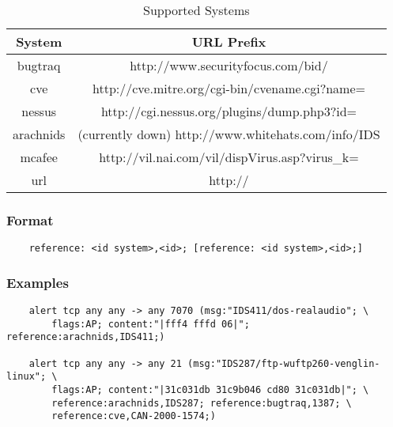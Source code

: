 \documentclass[english]{report}
\begin{document}
\begin{table}[h]
\begin{center}
\caption{Supported Systems}
\label{references systems}
\begin{tabular}{|c|c|}

\hline 
System&
URL Prefix\\
\hline

\hline 
bugtraq&
http://www.securityfocus.com/bid/\\

\hline 
cve&
http://cve.mitre.org/cgi-bin/cvename.cgi?name=\\

\hline 
nessus &
http://cgi.nessus.org/plugins/dump.php3?id=\\

\hline 
arachnids&
(currently down) http://www.whitehats.com/info/IDS\\

\hline 
mcafee&
http://vil.nai.com/vil/dispVirus.asp?virus\_k=\\

\hline 
url&
http://\\

\hline
\end{tabular}
\end{center}
\end{table}

\subsubsection{Format}

\begin{verbatim}
    reference: <id system>,<id>; [reference: <id system>,<id>;]
\end{verbatim}

\subsubsection{Examples}

\begin{verbatim}
    alert tcp any any -> any 7070 (msg:"IDS411/dos-realaudio"; \
        flags:AP; content:"|fff4 fffd 06|"; reference:arachnids,IDS411;)
    
    alert tcp any any -> any 21 (msg:"IDS287/ftp-wuftp260-venglin-linux"; \
        flags:AP; content:"|31c031db 31c9b046 cd80 31c031db|"; \
        reference:arachnids,IDS287; reference:bugtraq,1387; \
        reference:cve,CAN-2000-1574;)
\end{verbatim}
\end{document}
